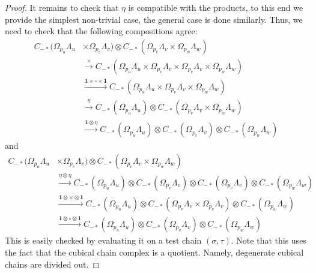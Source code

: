 \documentclass{gtpart}
\newcommand{\id}{\mathbf{1}}
\begin{document}
\begin{proof}
It remains to check that $\eta$ is compatible with the products, to this end we provide the simplest non-trivial case, the general case is done similarly. Thus, we need to check that the following compositions agree:
\begin{align*} 
C_{-*}(\Omega_{p_u} \Lambda_u &\times \Omega_{p_v} \Lambda_v) \otimes 
C_{-*}(\Omega_{p_v} \Lambda_v \times \Omega_{p_w} \Lambda_w) \\
    &\xrightarrow{\times}   C_{-*}(\Omega_{p_u} \Lambda_u \times \Omega_{p_v} \Lambda_v \times \Omega_{p_v} \Lambda_v \times
    \Omega_{p_w} \Lambda_w)\\ & \xrightarrow{\id \times \circ \times \id}  
C_{-*}(\Omega_{p_u} \Lambda_u \times \Omega_{p_v} \Lambda_v \times
    \Omega_{p_w} \Lambda_w)\\ & \xrightarrow{\eta} 
    C_{-*}(\Omega_{p_u} \Lambda_u)  \otimes C_{-*}(\Omega_{p_v} \Lambda_v \times
    \Omega_{p_w} \Lambda_w) \\ & \xrightarrow{\id \otimes \eta} 
    C_{-*}(\Omega_{p_u} \Lambda_u)  \otimes C_{-*}(\Omega_{p_v} \Lambda_v) \otimes
    C_{-*}(\Omega_{p_w} \Lambda_w)  
\end{align*}
and 
\begin{align*} C_{-*}(\Omega_{p_u} \Lambda_u &\times \Omega_{p_v} \Lambda_v) \otimes 
    C_{-*}(\Omega_{p_v} \Lambda_v \times \Omega_{p_w} \Lambda_w) \\
    &\xrightarrow{\eta \otimes \eta}  
    C_{-*}(\Omega_{p_u} \Lambda_u) \otimes C_{-*}(\Omega_{p_v} \Lambda_v) \otimes
    C_{-*}(\Omega_{p_v} \Lambda_v) \otimes C_{-*}(\Omega_{p_w} \Lambda_w)\\ & \xrightarrow{\id
    \otimes \times \otimes \id}  
    C_{-*}(\Omega_{p_u} \Lambda_u) \otimes C_{-*}(\Omega_{p_v} \Lambda_v \times \Omega_{p_v}  \Lambda_v)
    \otimes C_{-*}(\Omega_{p_w} \Lambda_w)\\ & \xrightarrow{\id \otimes \circ \otimes \id} 
    C_{-*}(\Omega_{p_u} \Lambda_u)  \otimes C_{-*}(\Omega_{p_v} \Lambda_v) \otimes
    C_{-*}(\Omega_{p_w} \Lambda_w)  
\end{align*}
This is easily checked by evaluating it on a test chain $(\sigma,\tau)$. Note that this uses the fact that the cubical chain complex is a quotient. Namely, degenerate cubical chains are divided out.
\end{proof} 
\end{document}
